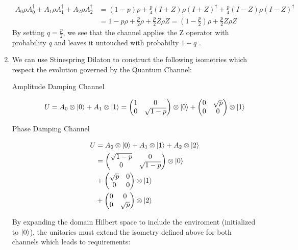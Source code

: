\documentclass[12pt]{article}%
\begin{document}
\begin{enumerate}
\begin{align*}
			A_0 \rho A_0^\dagger + 	A_1 \rho A_1^\dagger 	+ A_2	 \rho A_2^\dagger & = (1-p)\rho + \frac{p}{4}(I+Z)\rho(I+Z)^\dagger + \frac{p}{4} (I - Z) \rho (I-Z)^\dagger \\
													& = 1 - p\rho + \frac{p}{2} \rho + \frac{p}{2} Z\rho Z = (1 - \frac{p}{2})\rho + \frac{p}{2} Z\rho Z
		\end{align*}
		By setting $q = \frac{p}{2} $, we see that the channel applies the Z operator with probability \(q\)  and leaves it untouched with probabilty $1 - q$ 
		.\item 
		We can use Stinespring Dilaton to construct the following isometries which respect the evolution governed by the Quantum Channel:
		\begin{description}
			\item[Amplitude Damping Channel] 
				\begin{equation*}
					U = A_0 \otimes \ket{0} + A_1 \otimes \ket{1} =  \left(\begin{matrix} 1 & 0 \\ 0 & \sqrt{1-p} \end{matrix}\right) \otimes \ket{0} +  \left(\begin{matrix} 0 &  \sqrt{p} \\ 0 & 0  \end{matrix} \right) \otimes \ket{1}  
				\end{equation*}
			\item[Phase Damping Channel] 
				\begin{align*}
					U & = A_0 \otimes \ket{0} + A_1 \otimes \ket{1} + A_2 \otimes \ket{2} \\ 
						& = \left(\begin{matrix} \sqrt{1-p} & 0 \\ 0 & \sqrt{1-p} \end{matrix}\right) \otimes \ket{0} \\
						& + \left(\begin{matrix} \sqrt{p} & 0 \\ 0 & 0 \end{matrix}\right) \otimes \ket{1} \\ 
						& +	\left(\begin{matrix} 0 & 0 \\ 0 & \sqrt{p} \end{matrix}\right) \otimes \ket{2}
				\end{align*}
		\end{description}
		By expanding the domain Hilbert space to include the enviroment (initialized to $\ket{0}$), the unitaries must extend the isometry defined above for both channels which leads to requirements:

\end{enumerate}
\end{document}
